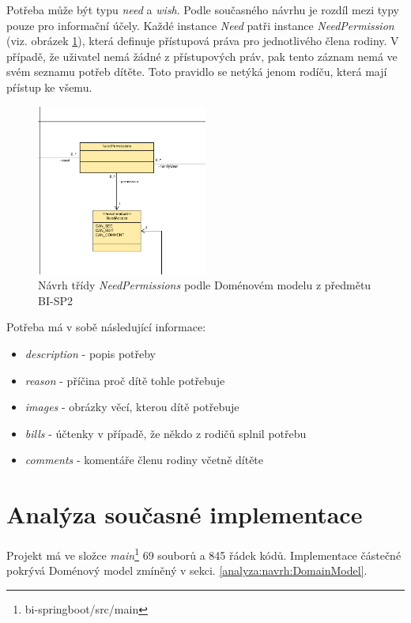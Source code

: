         Potřeba může být typu \textit{need} a \textit{wish}. Podle současného návrhu je rozdíl mezi typy pouze pro informační účely. Každé instance \textit{Need} patři instance \textit{NeedPermission} (viz. obrázek \ref{image:NeedPermissions1}), která definuje přístupová práva pro jednotlivého člena rodiny. V případě, že uživatel nemá žádné z přístupových práv, pak tento záznam nemá ve svém seznamu potřeb dítěte. Toto pravidlo se netýká jenom rodíču, která mají pŕístup ke všemu. 
        \begin{figure}\centering
	        \includegraphics[width=0.5\textwidth]{pdfs/NeedPermissions1}
	        \caption[Návrh NeedPermissions]{Návrh třídy \textit{NeedPermissions} podle Doménovém modelu z předmětu BI-SP2}\label{image:NeedPermissions1}
        \end{figure}
       
       Potřeba má v sobě následující informace:
        \begin{itemize}
            \item \textit{description} - popis potřeby
            \item \textit{reason} - příčina proč dítě tohle potřebuje
            \item \textit{images} - obrázky věcí, kterou dítě potřebuje
            \item \textit{bills} - účtenky v případě, že někdo z rodičů splnil potřebu
            \item \textit{comments} - komentáře členu rodiny včetně dítěte
        \end{itemize}
     
    \section{Analýza současné implementace}\label{analyza:soucasnaImplementace}
        Projekt má ve složce \textit{main}\footnote{bi-springboot/src/main} 69 souborů a 845 řádek kódů. Implementace částečné pokrývá Doménový model zmíněný v sekci. \ref{analyza:navrh:DomainModel}.
        
